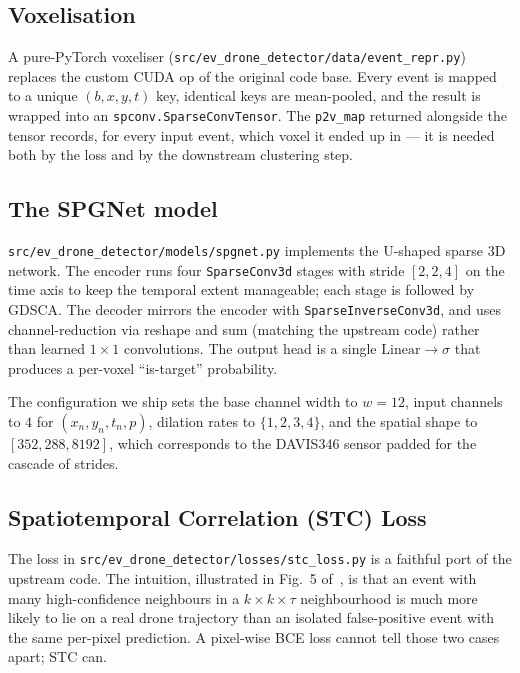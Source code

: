 \documentclass[11pt,a4paper]{article}
\begin{document}
\subsection{Voxelisation}

A pure-PyTorch voxeliser
(\texttt{src/ev\_drone\_detector/data/event\_repr.py}) replaces the
custom CUDA op of the original code base. Every event is mapped to
a unique $(b, x, y, t)$ key, identical keys are mean-pooled, and the
result is wrapped into an \texttt{spconv.SparseConvTensor}. The
\texttt{p2v\_map} returned alongside the tensor records, for every
input event, which voxel it ended up in --- it is needed both by the
loss and by the downstream clustering step.

\subsection{The SPGNet model}

\texttt{src/ev\_drone\_detector/models/spgnet.py} implements the
U-shaped sparse 3D network. The encoder runs four
\texttt{SparseConv3d} stages with stride $[2, 2, 4]$ on the time axis
to keep the temporal extent manageable; each stage is followed by
GDSCA. The decoder mirrors the encoder with
\texttt{SparseInverseConv3d}, and uses channel-reduction via reshape
and sum (matching the upstream code) rather than learned $1\times1$
convolutions. The output head is a single
$\text{Linear} \!\to\! \sigma$ that produces a per-voxel
``is-target'' probability.

The configuration we ship sets the base channel width to $w = 12$,
input channels to $4$ for $(x_n, y_n, t_n, p)$, dilation rates to
$\{1, 2, 3, 4\}$, and the spatial shape to
$[352, 288, 8192]$, which corresponds to the DAVIS346 sensor padded
for the cascade of strides.

\subsection{Spatiotemporal Correlation (STC) Loss}

The loss in \texttt{src/ev\_drone\_detector/losses/stc\_loss.py} is a
faithful port of the upstream code. The intuition, illustrated in
Fig.~5 of~\cite{chen2025evspsegnet}, is that an event with many
high-confidence neighbours in a $k\!\times\!k\!\times\!\tau$
neighbourhood is much more likely to lie on a real drone trajectory
than an isolated false-positive event with the same per-pixel
prediction. A pixel-wise BCE loss cannot tell those two cases apart;
STC can.
\end{document}
